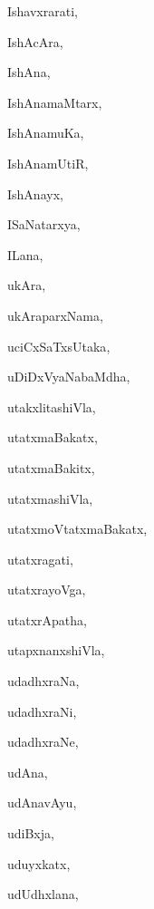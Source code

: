 \begin{multicols}{3}
{\noindent
{Ishavxrarati}, \pageref{Ishavxrarati}

\noindent
{IshAcAra}, \pageref{IshAcAra}

\noindent
{IshAna}, \pageref{IshAna}

\noindent
{IshAnamaMtarx}, \pageref{IshAnamaMtarx}

\noindent
{IshAnamuKa}, \pageref{IshAnamuKa}

\noindent
{IshAnamUtiR}, \pageref{IshAnamUtiR}

\noindent
{IshAnayx}, \pageref{IshAnayx}

\noindent
{ISaNatarxya}, \pageref{ISaNatarxya}

\noindent
{ILana}, \pageref{ILana}

\noindent
{ukAra}, \pageref{ukAra}

\noindent
{ukAraparxNama}, \pageref{ukAraparxNama}

\noindent
{uciCxSaTxsUtaka}, \pageref{uciCxSaTxsUtaka}

\noindent
{uDiDxVyaNabaMdha}, \pageref{uDiDxVyaNabaMdha}

\noindent
{utakxlitashiVla}, \pageref{utakxlitashiVla}

\noindent
{utatxmaBakatx}, \pageref{utatxmaBakatx}

\noindent
{utatxmaBakitx}, \pageref{utatxmaBakitx}

\noindent
{utatxmashiVla}, \pageref{utatxmashiVla}

\noindent
{utatxmoVtatxmaBakatx}, \pageref{utatxmoVtatxmaBakatx}

\noindent
{utatxragati}, \pageref{utatxragati}

\noindent
{utatxrayoVga}, \pageref{utatxrayoVga}

\noindent
{utatxrApatha}, \pageref{utatxrApatha}

\noindent
{utapxnanxshiVla}, \pageref{utapxnanxshiVla}

\noindent
{udadhxraNa}, \pageref{udadhxraNa}

\noindent
{udadhxraNi}, \pageref{udadhxraNi}

\noindent
{udadhxraNe}, \pageref{udadhxraNe}

\noindent
{udAna}, \pageref{udAna}

\noindent
{udAnavAyu}, \pageref{udAnavAyu}

\noindent
{udiBxja}, \pageref{udiBxja}

\noindent
{uduyxkatx}, \pageref{uduyxkatx}

\noindent
{udUdhxlana}, \pageref{udUdhxlana}

}
\end{multicols}
